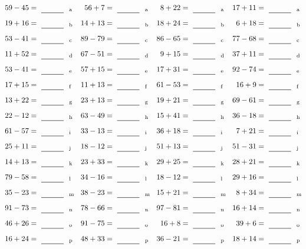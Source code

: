 \documentclass
[
  draft    = true,
  fontsize = 11pt,
  parskip  = half-
]
{scrartcl}
\begin{document}
\clearpage
\begin{align*}
    \pline{59-45}&=\rline{a}
  & \pline{56+7}&=\rline{a}
  & \pline{8+22}&=\rline{a}
  & \pline{17+11}&=\rline{a} \\[1ex]
    \pline{19+16}&=\rline{b}
  & \pline{14+13}&=\rline{b}
  & \pline{18+24}&=\rline{b}
  & \pline{6+18}&=\rline{b} \\[1ex]
    \pline{53-41}&=\rline{c}
  & \pline{89-79}&=\rline{c}
  & \pline{86-65}&=\rline{c}
  & \pline{77-68}&=\rline{c} \\[1ex]
    \pline{11+52}&=\rline{d}
  & \pline{67-51}&=\rline{d}
  & \pline{9+15}&=\rline{d}
  & \pline{37+11}&=\rline{d} \\[1ex]
    \pline{53-41}&=\rline{e}
  & \pline{57+15}&=\rline{e}
  & \pline{17+31}&=\rline{e}
  & \pline{92-74}&=\rline{e} \\[1ex]
    \pline{17+15}&=\rline{f}
  & \pline{11+13}&=\rline{f}
  & \pline{61-53}&=\rline{f}
  & \pline{16+9}&=\rline{f} \\[1ex]
    \pline{13+22}&=\rline{g}
  & \pline{23+13}&=\rline{g}
  & \pline{19+21}&=\rline{g}
  & \pline{69-61}&=\rline{g} \\[1ex]
    \pline{22-12}&=\rline{h}
  & \pline{63-49}&=\rline{h}
  & \pline{15+41}&=\rline{h}
  & \pline{36-18}&=\rline{h} \\[1ex]
    \pline{61-57}&=\rline{i}
  & \pline{33-13}&=\rline{i}
  & \pline{36+18}&=\rline{i}
  & \pline{7+21}&=\rline{i} \\[1ex]
    \pline{25+11}&=\rline{j}
  & \pline{18-12}&=\rline{j}
  & \pline{51+13}&=\rline{j}
  & \pline{51-31}&=\rline{j} \\[1ex]
    \pline{14+13}&=\rline{k}
  & \pline{23+33}&=\rline{k}
  & \pline{29+25}&=\rline{k}
  & \pline{28+21}&=\rline{k} \\[1ex]
    \pline{79-58}&=\rline{l}
  & \pline{34-16}&=\rline{l}
  & \pline{18-12}&=\rline{l}
  & \pline{29+16}&=\rline{l} \\[1ex]
    \pline{35-23}&=\rline{m}
  & \pline{38-23}&=\rline{m}
  & \pline{15+21}&=\rline{m}
  & \pline{8+34}&=\rline{m} \\[1ex]
    \pline{91-73}&=\rline{n}
  & \pline{78-66}&=\rline{n}
  & \pline{97-81}&=\rline{n}
  & \pline{16+14}&=\rline{n} \\[1ex]
    \pline{46+26}&=\rline{o}
  & \pline{91-75}&=\rline{o}
  & \pline{16+8}&=\rline{o}
  & \pline{39+6}&=\rline{o} \\[1ex]
    \pline{16+24}&=\rline{p}
  & \pline{48+33}&=\rline{p}
  & \pline{36-21}&=\rline{p}
  & \pline{18+14}&=\rline{p}
\end{align*}
\end{document}
